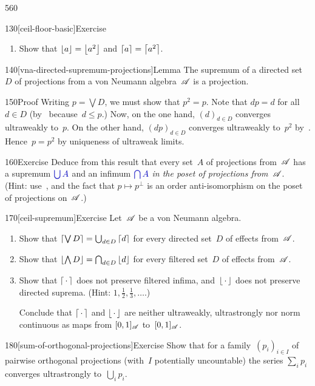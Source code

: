 \begin{parsec}{560}
\begin{point}{130}[ceil-floor-basic]{Exercise}
\begin{enumerate}
Use this to prove that~$\ceil{\lambda a+\lambda^\perp b}$
is the supremum of~$\ceil{a}$ and~$\ceil{b}$
in the poset of projections of~$\scrA$
when~$\lambda\neq 0$ and~$\lambda\neq 1$.
\item
Show that $\left\lfloor a\right\rfloor=\left\lfloor a^2\right\rfloor$
and $\left\lceil a\right\rceil=\left\lceil a^2\right\rceil$.
\end{enumerate}%
\spacingfix%
\end{point}%
\begin{point}{140}[vna-directed-supremum-projections]{Lemma}%
The supremum of a directed set~$D$ of projections
from a von Neumann algebra~$\scrA$ is a projection.
\begin{point}{150}{Proof}%
Writing $p=\bigvee D$,
we must show that $p^2=p$.
Note that $dp=d$ for all~$d\in D$
(by~ because~$d\leq p$.)
Now, on the one hand, $(d)_{d\in D}$
converges ultraweakly to~$p$.
On the other hand,
$(dp)_{d\in D}$
converges ultraweakly to~$p^2$ by~.
Hence~$p=p^2$ by uniqueness of ultraweak limits.
\end{point}
\end{point}
\begin{point}{160}{Exercise}%
Deduce from this result
 that every set~$A$ of projections from~$\scrA$
has a supremum $\Define{\bigcup A}$%
and an infimum $\Define{\bigcap A}$%
\emph{in the poset of projections from~$\scrA$}.\\
(Hint: use~,
and the fact that $p\mapsto p^\perp$ 
is an order anti-isomorphism on the poset of projections on~$\scrA$.)
\end{point}
\begin{point}{170}[ceil-supremum]{Exercise}
Let~$\scrA$ be a von Neumann algebra.
\begin{enumerate}
\item
Show that $\left\lceil\bigvee D\right\rceil=\bigcup_{d\in D} \left\lceil d\right\rceil$
for every directed set~$D$ of effects from~$\scrA$.
\item
Show that $\left\lfloor\bigwedge D\right\rfloor = \bigcap_{d\in D} \left\lfloor d\right\rfloor$
for every filtered set~$D$ of effects from~$\scrA$.
\item
Show that $\left\lceil\,\cdot\,\right\rceil$
does not preserve filtered infima,
and~$\left\lfloor\,\cdot\,\right\rfloor$
does not preserve directed suprema.
(Hint: $1,\frac{1}{2},\frac{1}{3},\dotsc$.)

Conclude that $\left\lceil\,\cdot\,\right\rceil$
and $\left\lfloor\,\cdot\,\right\rfloor$
are neither ultraweakly, ultrastrongly nor norm  continuous
as maps from $[0,1]_{\mathscr{A}}$ to~$[0,1]_{\mathscr{A}}$.
\end{enumerate}
\spacingfix
\end{point}%
\begin{point}{180}[sum-of-orthogonal-projections]{Exercise}%
Show that for a family~$(p_i)_{i\in I}$ 
of pairwise orthogonal projections
(with~$I$ potentially uncountable)
the series $\sum_i p_i$
converges ultrastrongly to~$\bigcup_i p_i$.


\end{point}
\end{parsec}
